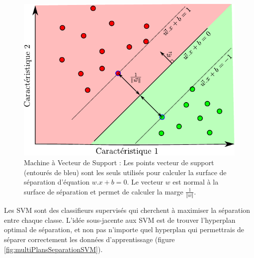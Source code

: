\begin{figure}[h]
	\begin{center}
	\includegraphics[width=12cm]{images/SVM}
	\end{center}
	\caption[Machine à Vecteur de Support]{Machine à Vecteur de Support : Les points vecteur de support (entourés de bleu) sont les seuls utilisés pour calculer la surface de séparation d'équation $w . x + b = 0$. Le vecteur $w$ est normal à la surface de séparation et permet de calculer la marge $\frac{1}{\Vert w \Vert}$.}
	\label{fig:SVM}
\end{figure}


Les SVM sont des classifieurs supervisés qui cherchent à maximiser la séparation entre chaque classe. L'idée sous-jacente aux SVM est de trouver l'hyperplan optimal de séparation, et non pas n'importe quel hyperplan qui permettrais de séparer correctement les données d'apprentissage (figure \ref{fig:multiPlansSeparationSVM}). 


